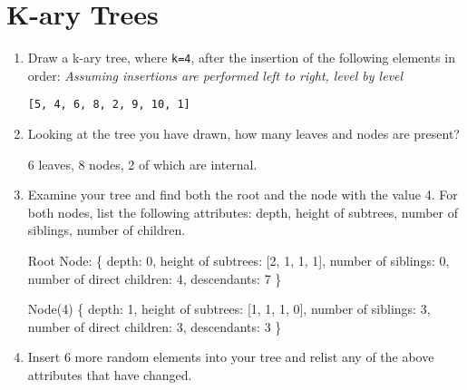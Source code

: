 \documentclass[11pt]{article}
\begin{document}
    \section{K-ary Trees}
    \begin{enumerate}
        \item Draw a k-ary tree, where \verb|k=4|, after the insertion of the following elements in order: \emph{Assuming insertions are performed left to right, level by level}
        
        \verb|[5, 4, 6, 8, 2, 9, 10, 1]|

        
        \item Looking at the tree you have drawn, how many leaves and nodes are present? 

        6 leaves, 8 nodes, 2 of which are internal.
        
        \item Examine your tree and find both the root and the node with the value 4. For both nodes, list the following attributes: depth, height of subtrees, number of siblings, number of children. 

        Root Node: \{ depth: 0, height of subtrees: [2, 1, 1, 1], number of siblings: 0, number of direct children: 4, descendants: 7 \}

        Node(4) \{ depth: 1, height of subtrees: [1, 1, 1, 0], number of siblings: 3, number of direct children: 3, descendants: 3 \}
        
        \item Insert 6 more random elements into your tree and relist any of the above attributes that have changed.


\end{enumerate}
\end{document}
